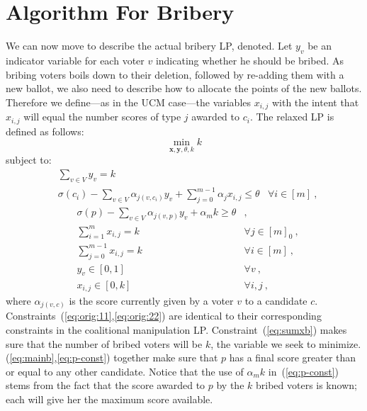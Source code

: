 \documentclass[letterpaper]{article} %
\theoremstyle{definition}
\newcommand\vecc{\mathbf}
\begin{document}
\section{Algorithm For Bribery}
We can now move to describe the actual bribery LP, denoted. Let $y_v$  be an indicator variable for  each voter $v$ indicating whether he should be bribed. As bribing voters boils down to their deletion, followed by re-adding them with a new ballot, we also need to describe how to allocate the points of the new ballots. Therefore we define---as in the UCM case---the variables $x_{i,j}$ with the intent that $x_{i,j}$ will equal the number scores of type $j$ awarded to $c_i$.  The  relaxed LP is defined as follows:
\begin{equation*}
\min_{\vecc{x}, \vecc{y}, \theta,k} k
\end{equation*}
subject to:
\begin{align}
&\sum_{v \in V}y_v = k &\label{eq:sumxb}\\
&\sigma(c_i) - \sum_{v \in V}\alpha_{j(v,c_i)} y_{v} + \sum_{j=0}^{m-1} \alpha_j x_{i,j}\leq \theta &\forall i\in[m]\label{eq:mainb}\ ,
\end{align}
\begin{align}
&\sigma(p) - \sum_{v \in V}\alpha_{j(v,p)} y_{v} + \alpha_m k \geq \theta &, \label{eq:p-const}\\
&\sum_{i=1}^m x_{i,j}=k &\forall j\in[m]_0\label{eq:orig:11}\ ,\\
&\sum_{j=0}^{m-1}x_{i,j}=k &\forall i\in[m]\label{eq:orig:22}\ ,\\
&y_{v} \in [0,1] & \forall v\ ,\\
&x_{i,j} \in [0,k] & \forall i,j\ ,
\end{align}
where $\alpha_{j(v,c)}$ is the score currently given by a voter $v$ to a candidate $c$. Constraints~(\ref{eq:orig:11},\ref{eq:orig:22}) are identical to their corresponding constraints in the coalitional manipulation LP.
Constraint~(\ref{eq:sumxb}) makes sure that the number of bribed voters will be $k$, the variable we seek to minimize.
(\ref{eq:mainb},\ref{eq:p-const}) together make sure that $p$ has a final score greater than or equal to any other candidate.
Notice that the use of $\alpha_m k$ in~(\ref{eq:p-const})  stems from the fact that the score awarded to $p$ by the $k$ bribed voters is known; each will give her the maximum score available.
\end{document}
